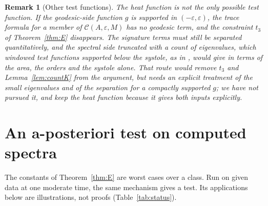 \documentclass[pdflatex,sn-mathphys-num]{sn-jnl}
\theoremstyle{thmstyleone}%
\theoremstyle{thmstylethree}%
\newtheorem{remark}[theorem]{Remark}%
\newcommand{\Cl}{\mathcal{C}}
\begin{document}
\begin{remark}[Other test functions]\label{rem:testfn}
The heat function is not the only possible test function. If the geodesic-side function $g$ is supported in $(-\varepsilon,\varepsilon)$, the trace formula for a member of $\Cl(A,\varepsilon,M)$ has no geodesic term, and the constraint $t_3$ of Theorem~\ref{thm:E} disappears. The signature terms must still be separated quantitatively, and the spectral side truncated with a count of eigenvalues, which windowed test functions supported below the systole, as in \cite[proof of Lemma~\ref*{A-lem:admissible}]{companionA}, would give in terms of the area, the orders and the systole alone. That route would remove $t_3$ and Lemma~\ref{lem:countK} from the argument, but needs an explicit treatment of the small eigenvalues and of the separation for a compactly supported $g$; we have not pursued it, and keep the heat function because it gives both inputs explicitly.
\end{remark}

\section{An a-posteriori test on computed spectra}\label{sec:practice}

The constants of Theorem~\ref{thm:E} are worst cases over a class. Run on given data at one moderate time, the same mechanism gives a test. Its applications below are illustrations, not proofs (Table~\ref{tab:status}).
\end{document}
